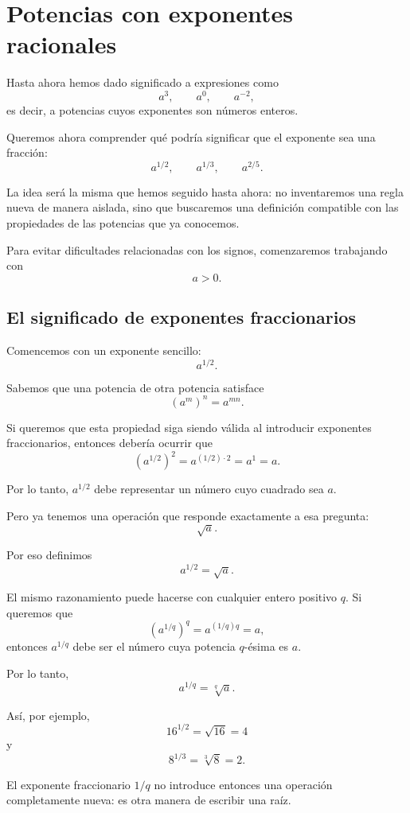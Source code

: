 \section{Potencias con exponentes racionales}

Hasta ahora hemos dado significado a expresiones como
\[
a^3,\qquad a^0,\qquad a^{-2},
\]
es decir, a potencias cuyos exponentes son números enteros.

Queremos ahora comprender qué podría significar que el exponente sea una fracción:
\[
a^{1/2},
\qquad
a^{1/3},
\qquad
a^{2/5}.
\]

La idea será la misma que hemos seguido hasta ahora: no inventaremos una regla nueva de manera aislada, sino que buscaremos una definición compatible con las propiedades de las potencias que ya conocemos.

Para evitar dificultades relacionadas con los signos, comenzaremos trabajando con
\[
a>0.
\]

\subsection{El significado de exponentes fraccionarios}

Comencemos con un exponente sencillo:
\[
a^{1/2}.
\]

Sabemos que una potencia de otra potencia satisface
\[
(a^m)^n=a^{mn}.
\]

Si queremos que esta propiedad siga siendo válida al introducir exponentes fraccionarios, entonces debería ocurrir que
\[
\left(a^{1/2}\right)^2
=
a^{(1/2)\cdot2}
=
a^1
=
a.
\]

Por lo tanto, \(a^{1/2}\) debe representar un número cuyo cuadrado sea \(a\).

Pero ya tenemos una operación que responde exactamente a esa pregunta:
\[
\sqrt a.
\]

Por eso definimos
\[
a^{1/2}=\sqrt a.
\]

El mismo razonamiento puede hacerse con cualquier entero positivo \(q\). Si queremos que
\[
\left(a^{1/q}\right)^q
=
a^{(1/q)q}
=
a,
\]
entonces \(a^{1/q}\) debe ser el número cuya potencia \(q\)-ésima es \(a\).

Por lo tanto,
\[
\boxed{a^{1/q}=\sqrt[q]{a}}.
\]

Así, por ejemplo,
\[
16^{1/2}=\sqrt{16}=4
\]
y
\[
8^{1/3}=\sqrt[3]{8}=2.
\]

El exponente fraccionario \(1/q\) no introduce entonces una operación completamente nueva: es otra manera de escribir una raíz.

